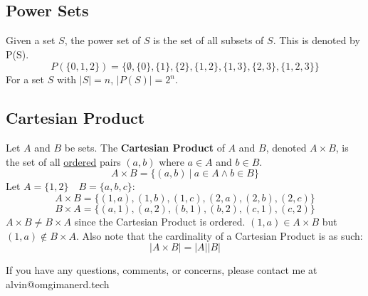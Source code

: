 \documentclass[letterpaper, 12pt]{math}
\begin{document}
\subsection*{Power Sets}
Given a set \( S \), the power set of \( S \) is the set of all subsets of
\( S \). This is denoted by P(S).
\[ P(\{0,1,2\}) = \{ \emptyset, \{0\}, \{1\}, \{2\}, \{1,2\}, \{1,3\}, \{2,3\},
   \{1,2,3\}\} \]
For a set \( S \) with \( |S| = n \), \( |P(S)| = 2^{n} \).

\subsection*{Cartesian Product}
Let \( A \) and \( B \) be sets. The \textbf{Cartesian Product} of \( A \) and
\( B \), denoted \( A \times B \), is the set of all \underline{ordered} pairs
\( (a, b) \) where \( a \in A \) and \( b \in B \).
\[ A \times B = \{(a,b)\ |\ a \in A \wedge b \in B\} \]
Let \( A = \{1,2\} \quad B = \{a,b,c\} \):
\[ A \times B = \{(1,a),(1,b),(1,c),(2,a),(2,b),(2,c)\} \]
\[ B \times A = \{(a,1),(a,2),(b,1),(b,2),(c,1),(c,2)\} \]
\( A \times B \neq B \times A \) since the Cartesian Product is ordered.
\( (1,a) \in A \times B \) but \( (1,a) \notin B \times A \).
Also note that the cardinality of a Cartesian Product is as such:
\[ |A \times B| = |A||B| \]

\begin{center}
  If you have any questions, comments, or concerns, please contact me at
  alvin@omgimanerd.tech
\end{center}
\end{document}
